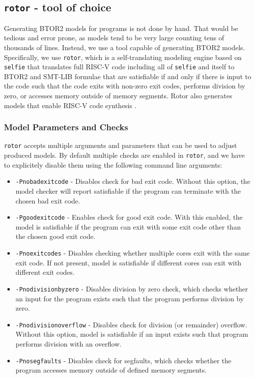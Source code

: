 \documentclass[12pt]{article}
\begin{document}
\subsection{\texttt{rotor} - tool of choice}

Generating BTOR2 models for programs is not done by hand. That would be tedious
and error prone, as models tend to be very large counting tens of thousands of
lines. Instead, we use a tool capable of generating BTOR2 models. Specifically,
we use \texttt{rotor}, which is a self-translating modeling engine based on
\texttt{selfie} that translates full RISC-V code including all of
\texttt{selfie} and itself to BTOR2 and SMT-LIB formulae that are satisfiable
if and only if there is input to the code such that the code exits with
non-zero exit codes, performs division by zero, or accesses memory outside of
memory segments. Rotor also generates models that enable RISC-V code synthesis
\cite{gh:rotor}.

\subsubsection{Model Parameters and Checks}

\texttt{rotor} accepts multiple arguments and parameters that can be used to
adjust produced models. By default multiple checks are enabled in
\texttt{rotor}, and we have to explicitely disable them using the following
command line arguments:

\begin{itemize}
    \item \texttt{-Pnobadexitcode} - Disables check for bad exit code. Without
        this option, the model checker will report satisfiable if the program
        can terminate with the chosen bad exit code.
    \item \texttt{-Pgoodexitcode} - Enables check for good exit code. With this
        enabled, the model is satisfiable if the program can exit with some 
        exit code other than the chosen good exit code.
    \item \texttt{-Pnoexitcodes} - Disables checking whether multiple cores
        exit with the same exit code. If not present, model is satisfiable if
        different cores can exit with different exit codes.
    \item \texttt{-Pnodivisionbyzero} - Disables division by zero check, which
        checks whether an input for the program exists such that the program
        performs division by zero.
    \item \texttt{-Pnodivisionoverflow} - Disables check for division (or
        remainder) overflow. Without this option, model is satisfiable if an
        input exists such that program performs division with an overflow.
    \item \texttt{-Pnosegfaults} - Disables check for segfaults, which checks
        whether the program accesses memory outside of defined memory segments.
\end{itemize}
\end{document}
